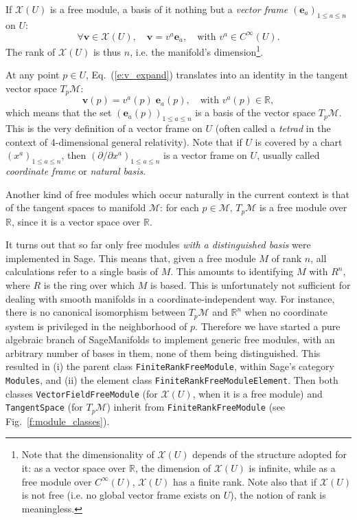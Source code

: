 \documentclass[a4paper]{jpconf}
\newcommand{\soft}[1]{\textsf{#1}}
\newcommand{\code}[1]{\texttt{#1}}
\newcommand{\Sage}{\soft{Sage}}
\newcommand{\SM}{\soft{SageManifolds}}
\newcommand{\be}{\begin{equation}}
\newcommand{\ee}{\end{equation}}
\newcommand{\w}[1]{\bm{#1}}
\begin{document}
If $\mathscr{X}(U)$ is a free module, a basis of it nothing but a \emph{vector frame}
$(\w{e}_a)_{1\leq a \leq n}$ on $U$:
\be \label{e:v_expand}
    \forall \w{v}\in\mathscr{X}(U),\quad \w{v} = v^a \w{e}_a,\quad\mbox{with\ } v^a \in C^\infty(U) .
\ee
The rank of $\mathscr{X}(U)$ is thus $n$, i.e. the manifold's 
dimension\footnote{Note that the dimensionality of $\mathscr{X}(U)$ depends
of the structure adopted for it: as a vector space over $\mathbb{R}$, the
dimension of $\mathscr{X}(U)$ is infinite, while as a free module over
$C^\infty(U)$, $\mathscr{X}(U)$ has a finite rank. Note also that if $\mathscr{X}(U)$
is not free (i.e. no global vector frame exists on $U$), the notion of rank 
is meaningless.}.

At any point $p\in U$, Eq.~(\ref{e:v_expand}) translates into an identity in 
the tangent vector space $T_p \mathcal{M}$:
\be 
    \w{v}(p) = v^a(p)  \; \w{e}_a(p),\quad\mbox{with\ } v^a(p) \in \mathbb{R} , 
\ee
which means that 
the set $(\w{e}_a(p))_{1\leq a \leq n}$ is a basis of the vector space $T_p \mathcal{M}$.
This is the very definition of a vector frame on $U$ (often called a \emph{tetrad} in
the context of 4-dimensional general relativity). Note that if $U$ is covered
by a chart $(x^a)_{1\leq a \leq n}$, then $(\partial/\partial x^a)_{1\leq a \leq n}$
is a vector frame on $U$, usually called \emph{coordinate frame}
or \emph{natural basis}. 


Another kind of free modules which occur naturally in the current context
is that of the tangent spaces to manifold $\mathcal{M}$: 
for each $p\in \mathcal{M}$, $T_p\mathcal{M}$ is a free module over 
$\mathbb{R}$, since it is a vector space over $\mathbb{R}$. 

It turns out that so far only free modules \emph{with a distinguished basis} were 
implemented in \Sage{}. This means that, given a free module $M$ of rank $n$, 
all calculations refer to a single basis of $M$. This amounts to identifying
$M$ with $R^n$, where $R$ is the ring over which $M$ is based. 
This is unfortunately not sufficient for dealing with smooth manifolds in a
coordinate-independent way. 
For instance, there is no canonical 
isomorphism between $T_p\mathcal{M}$ and $\mathbb{R}^n$ when no coordinate
system is privileged in the neighborhood of $p$.
Therefore we have started a pure algebraic branch of \SM{} to implement
generic free modules, with an arbitrary number of bases in them, 
none of them being distinguished. This resulted in (i) the parent class 
\code{FiniteRankFreeModule}, within \Sage{}'s category \code{Modules}, and (ii)
the element class 
\code{FiniteRankFreeModuleElement}. Then both classes
\code{VectorFieldFreeModule} (for $\mathscr{X}(U)$, when it is 
a free module) and \code{TangentSpace} (for $T_p\mathcal{M}$)
inherit from \code{FiniteRankFreeModule} (see Fig.~\ref{f:module_classes}). 
\end{document}
